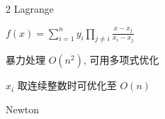 \begin{multicols}{2}
    Lagrange
    
    $
        f(x) = \sum_{i=1}^{n}y_i\prod_{j\neq i}\frac{x - x_j}{x_i - x_j}
    $

    暴力处理 $O(n^2)$, 可用多项式优化

    $x_i$ 取连续整数时可优化至 $O(n)$

    \newcolumn
    Newton

\end{multicols}
